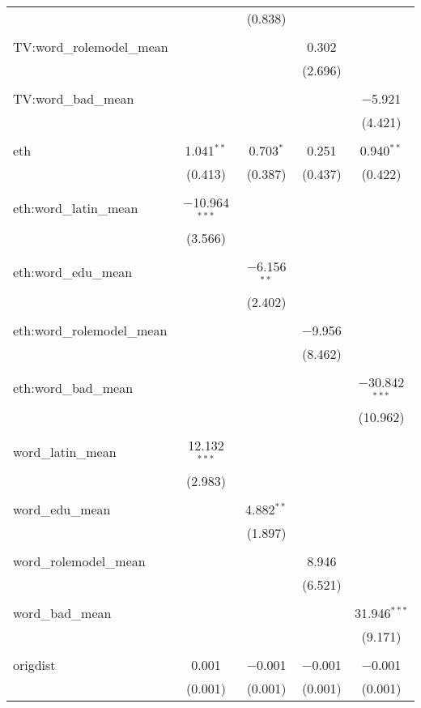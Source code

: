 \begin{table}[!htbp]
\begin{tabular}{@{\extracolsep{-2pt}}lcccc}
  &  & (0.838) &  &  \\ 
  & & & & \\ 
 TV:word\_rolemodel\_mean &  &  & 0.302 &  \\ 
  &  &  & (2.696) &  \\ 
  & & & & \\ 
 TV:word\_bad\_mean &  &  &  & $-$5.921 \\ 
  &  &  &  & (4.421) \\ 
  & & & & \\ 
 eth & 1.041$^{**}$ & 0.703$^{*}$ & 0.251 & 0.940$^{**}$ \\ 
  & (0.413) & (0.387) & (0.437) & (0.422) \\ 
  & & & & \\ 
 eth:word\_latin\_mean & $-$10.964$^{***}$ &  &  &  \\ 
  & (3.566) &  &  &  \\ 
  & & & & \\ 
 eth:word\_edu\_mean &  & $-$6.156$^{**}$ &  &  \\ 
  &  & (2.402) &  &  \\ 
  & & & & \\ 
 eth:word\_rolemodel\_mean &  &  & $-$9.956 &  \\ 
  &  &  & (8.462) &  \\ 
  & & & & \\ 
 eth:word\_bad\_mean &  &  &  & $-$30.842$^{***}$ \\ 
  &  &  &  & (10.962) \\ 
  & & & & \\ 
 word\_latin\_mean & 12.132$^{***}$ &  &  &  \\ 
  & (2.983) &  &  &  \\ 
  & & & & \\ 
 word\_edu\_mean &  & 4.882$^{**}$ &  &  \\ 
  &  & (1.897) &  &  \\ 
  & & & & \\ 
 word\_rolemodel\_mean &  &  & 8.946 &  \\ 
  &  &  & (6.521) &  \\ 
  & & & & \\ 
 word\_bad\_mean &  &  &  & 31.946$^{***}$ \\ 
  &  &  &  & (9.171) \\ 
  & & & & \\ 
 origdist & 0.001 & $-$0.001 & $-$0.001 & $-$0.001 \\ 
  & (0.001) & (0.001) & (0.001) & (0.001) \\ 

\end{tabular}
\end{table}
